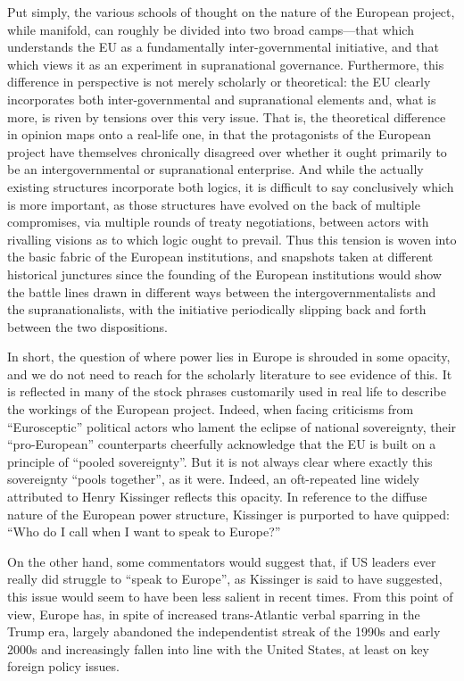 \documentclass[11pt,a4paper]{article}
\begin{document}
Put simply, the various schools of thought on the nature of the European project, while manifold, can roughly be divided into two broad camps---that which understands the EU as a fundamentally inter-governmental initiative, and that which views it as an experiment in supranational governance. Furthermore, this difference in perspective is not merely scholarly or theoretical: the EU clearly incorporates both inter-governmental and supranational elements and, what is more, is riven by tensions over this very issue. That is, the theoretical difference in opinion maps onto a real-life one, in that the protagonists of the European project have themselves chronically disagreed over whether it ought primarily to be an intergovernmental or supranational enterprise. And while the actually existing structures incorporate both logics, it is difficult to say conclusively which is more important, as those structures have evolved on the back of multiple compromises, via multiple rounds of treaty negotiations, between actors with rivalling visions as to which logic ought to prevail. Thus this tension is woven into the basic fabric of the European institutions, and snapshots taken at different historical junctures since the founding of the European institutions would show the battle lines drawn in different ways between the intergovernmentalists and the supranationalists, with the initiative periodically slipping back and forth between the two dispositions.

In short, the question of where power lies in Europe is shrouded in some opacity, and we do not need to reach for the scholarly literature to see evidence of this. It is reflected in many of the stock phrases customarily used in real life to describe the workings of the European project. Indeed, when facing criticisms from ``Eurosceptic'' political actors who lament the eclipse of national sovereignty, their ``pro-European'' counterparts cheerfully acknowledge that the EU is built on a principle of ``pooled sovereignty''. But it is not always clear where exactly this sovereignty ``pools together'', as it were. Indeed, an oft-repeated line widely attributed to Henry Kissinger reflects this opacity. In reference to the diffuse nature of the European power structure, Kissinger is purported to have quipped: ``Who do I call when I want to speak to Europe?''

On the other hand, some commentators would suggest that, if US leaders ever really did struggle to ``speak to Europe'', as Kissinger is said to have suggested, this issue would seem to have been less salient in recent times. From this point of view, Europe has, in spite of increased trans-Atlantic verbal sparring in the Trump era, largely abandoned the independentist streak of the 1990s and early 2000s and increasingly fallen into line with the United States, at least on key foreign policy issues.
\end{document}
